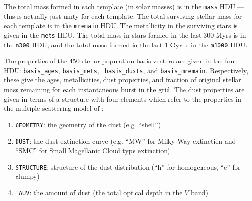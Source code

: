 \documentclass[10pt,preprint]{aastex}
\begin{document}
The total mass formed in each template (in solar masses) is in the
{\tt mass} HDU --- this is actually just unity for each template. The
total surviving stellar mass for each template is in the {\tt mremain}
HDU. The metallicity in the surviving stars is given in the {\tt mets}
HDU.  The total mass in stars formed in the last 300 Myrs is in the
{\tt m300} HDU, and the total mass formed in the last 1 Gyr is in the
{\tt m1000} HDU.

The properties of the 450 stellar population basis vectors are given
in the four HDU: {\tt basis\_ages}, {\tt basis\_mets}, {\tt
basis\_dusts}, and {\tt basis\_mremain}. Respectively, these give the
ages, metallicities, dust properties, and fraction of original stellar
mass remaining for each instantaneous burst in the grid. The dust 
properties are given in terms of a structure with four elements which
refer to the properties in the multiple scattering model of \citet{witt00a}:
\begin{enumerate}
\item {\tt GEOMETRY}: the geometry of the dust (e.g. ``shell'') 
\item {\tt DUST}: the dust extinction curve (e.g. ``MW'' for Milky
	Way extinction and ``SMC'' for Small Magellanic Cloud type
	extinction) 
\item {\tt STRUCTURE}: structure of the dust distribution (``h'' for
	homogeneous, ``c'' for clumpy)
\item {\tt TAUV}: the amount of dust (the total optical depth in the
	$V$ band)
\end{enumerate}

\newpage




\end{document}
